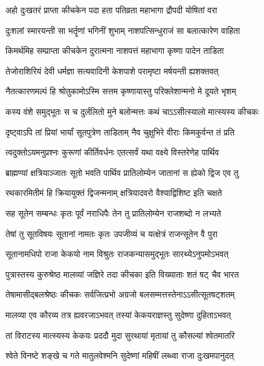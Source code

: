 \twolineshloka
{अहो दुःखतरं प्राप्ता कीचकेन पदा हता}
{पतिव्रता महाभागा द्रौपदी योषितां वरा}


\twolineshloka
{दुःशलां स्मारयन्ती सा भर्तॄणां भगिनीं शुभाम्}
{नाशपत्सिन्धुराजं सा बलात्कारेण वाहिता}


\twolineshloka
{किमर्थमिह सम्प्राप्ता कीचकेन दुरात्मना}
{नाशपत्तं महाभागा कृष्णा पादेन ताडिता}


\twolineshloka
{तेजोराशिरियं देवी धर्मज्ञा सत्यवादिनी}
{केशपाशे परामृष्टा मर्षयन्ती ह्यशक्तवत्}


\twolineshloka
{नैतत्कारणमल्पं हि श्रोतुकामोऽस्मि सत्तम}
{कृष्णायास्तु परिक्लेशान्मनो मे दूयते भृशम्}


\twolineshloka
{कस्य वंशे समुद्भूतः स च दुर्ललितो मुने}
{बलोन्मत्तः कथं चाऽऽसीत्स्यालो मात्स्यस्य कीचकः}


\twolineshloka
{दृष्ट्वाऽपि तां प्रियां भार्यां सूतपुत्रेण ताडिताम्}
{नैव चुक्षुभिरे वीराः किमकुर्वन्त तं प्रति}



\twolineshloka
{त्वदुक्तोऽयमनुप्रश्नः कुरूणां कीर्तिवर्धनः}
{एतत्सर्वं यथा वक्ष्ये विस्तरेणेह पार्थिव}


\twolineshloka
{ब्राह्मण्यां क्षत्रियाञ्जातः सूतो भवति पार्थिव}
{प्रातिलोम्येन जातानां स ह्येको द्विज एव तु}


\twolineshloka
{रथकारमितीमं हि क्रियायुक्तं द्विजन्मनाम्}
{क्षत्रियादवरो वैश्याद्विशिष्ट इति चक्षते}


\twolineshloka
{सह सूतेन सम्बन्धः कृतः पूर्वं नराधिपैः}
{तेन तु प्रातिलोम्येन राजशब्दो न लभ्यते}


\twolineshloka
{तेषां तु सूतविषयः सूतानां नामतः कृतः}
{उपजीव्यं च यत्क्षेत्रं राजन्सूतेन वै पुरा}


\twolineshloka
{सूतानामधिपो राजा केकयो नाम विश्रुतः}
{राजकन्यासमुद्भूतः सारथ्येऽनुपमोऽभवत्}


\twolineshloka
{पुत्रास्तस्य कुरुश्रेष्ठ मालव्यां जज्ञिरे तदा}
{कीचका इति विख्याताः शतं षट् चैव भारत}


\twolineshloka
{तेषामासीद्बलश्रेष्ठः कीचकः सर्वजित्प्रभो}
{अग्रजो बलसम्मत्तस्तेनाऽऽसीत्सूतषट्शतम्}


\twolineshloka
{मालव्या एव कौरव्य तत्र ह्यवरजाऽभवत्}
{तस्यां केकयराज्ञस्तु सुदेष्णा दुहिताऽभवत्}


\twolineshloka
{तां विराटस्य मात्स्यस्य केकयः प्रददौ मुदा}
{सुरथायां मृतायां तु कौसल्यां श्वेतमातरि}


\twolineshloka
{श्वेते विनष्टे शङ्खे च गते मातुलवेश्मनि}
{सुदेष्णां महिषीं लब्ध्वा राजा दुःखमपानुदत्}


